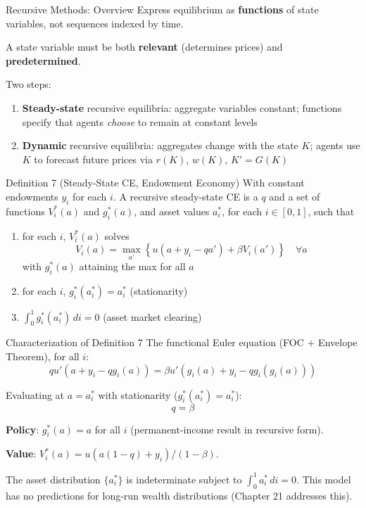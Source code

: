 \documentclass[blue]{beamer}
\begin{document}
\begin{frame}{Recursive Methods: Overview}
	Express equilibrium as \textbf{functions} of state variables, not sequences indexed by time.
	
	\bigskip
	A state variable must be both \textbf{relevant} (determines prices) and \textbf{predetermined}.
	
	\bigskip
	Two steps:
	\begin{enumerate}
		\item \textbf{Steady-state} recursive equilibria: aggregate variables constant; functions specify that agents \emph{choose} to remain at constant levels
		\item \textbf{Dynamic} recursive equilibria: aggregates change with the state $K$; agents use $K$ to forecast future prices via $r(K)$, $w(K)$, $K' = G(K)$
	\end{enumerate}
\end{frame}

\begin{frame}{Definition 7 (Steady-State CE, Endowment Economy)}
	With constant endowments $y_i$ for each $i$. A recursive steady-state CE is a $q$ and a set of functions $V_i^*(a)$ and $g_i^*(a)$, and asset values $a_i^*$, for each $i \in [0,1]$, such that
	
	\begin{enumerate}
		\item for each $i$, $V_i^*(a)$ solves
		\[
		V_i(a) = \max_{a'} \left\{ u(a + y_i - q a') + \beta V_i(a') \right\} \quad \forall a
		\]
		with $g_i^*(a)$ attaining the max for all $a$
		
		\item for each $i$, $g_i^*(a_i^*) = a_i^*$ \quad (stationarity)
		
		\item $\int_0^1 g_i^*(a_i^*) \, di = 0$ \quad (asset market clearing)
	\end{enumerate}
\end{frame}

\begin{frame}{Characterization of Definition 7}
	The functional Euler equation (FOC $+$ Envelope Theorem), for all $i$:
	\[
	q u'(a + y_i - q g_i(a)) = \beta u'(g_i(a) + y_i - q g_i(g_i(a)))
	\]
	
	Evaluating at $a = a_i^*$ with stationarity ($g_i^*(a_i^*) = a_i^*$):
	\[
	q = \beta
	\]
	
	\textbf{Policy}: $g_i^*(a) = a$ for all $i$ (permanent-income result in recursive form).
	
	\textbf{Value}: $V_i^*(a) = u(a(1-q) + y_i)/(1-\beta)$.
	
	\bigskip
	The asset distribution $\{a_i^*\}$ is indeterminate subject to $\int_0^1 a_i^* \, di = 0$. This model has no predictions for long-run wealth distributions (Chapter 21 addresses this).
\end{frame}
\end{document}
